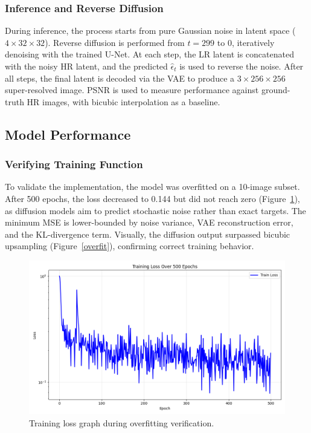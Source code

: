 \documentclass{article} %
\begin{document}
\subsubsection{Inference and Reverse Diffusion}

During inference, the process starts from pure Gaussian noise in latent space (\(4 \times 32 \times 32\)). Reverse diffusion is performed from \( t = 299 \) to \( 0 \), iteratively denoising with the trained U-Net. At each step, the LR latent is concatenated with the noisy HR latent, and the predicted \( \hat{\epsilon}_t \) is used to reverse the noise. After all steps, the final latent is decoded via the VAE to produce a \(3 \times 256 \times 256\) super-resolved image. PSNR is used to measure performance against ground-truth HR images, with bicubic interpolation as a baseline.

\subsection{Model Performance}

\subsubsection{Verifying Training Function}

To validate the implementation, the model was overfitted on a 10-image subset. After 500 epochs, the loss decreased to 0.144 but did not reach zero (Figure~\ref{overfitloss}), as diffusion models aim to predict stochastic noise rather than exact targets. The minimum MSE is lower-bounded by noise variance, VAE reconstruction error, and the KL-divergence term. Visually, the diffusion output surpassed bicubic upsampling (Figure~\ref{overfit}), confirming correct training behavior.

\begin{figure}[h]
\begin{center}
\includegraphics[width=1\textwidth]{progress/Figs/overfitloss.png}
\end{center}
\caption{Training loss graph during overfitting verification.}
\label{overfitloss}
\end{figure}
\end{document}

